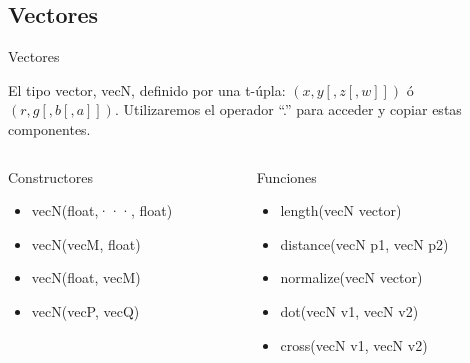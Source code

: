 \subsection{Vectores}
\begin{frame}{Vectores}

    El  tipo  vector, vecN,  definido  por  una  t-úpla:  \((x,y[,z[,w]])\) ó \((r,g[,b[,a]])\). Utilizaremos el operador \enquote{.} para acceder y copiar estas componentes.
    \vfill
    
    \begin{columns}[onlytextwidth]
        \begin{column}{0.45\textwidth}
            {\Large Constructores}
            \begin{itemize}
                \item vecN(float,···, float)
                \item vecN(vecM, float)
                \item vecN(float, vecM)
                \item vecN(vecP, vecQ)
            \end{itemize}
        \end{column}
        
        \begin{column}{0.45\textwidth}
            {\Large Funciones}
            \begin{itemize}
                \item length(vecN vector)
                \item distance(vecN p1, vecN p2)
                \item normalize(vecN vector)
                \item dot(vecN v1, vecN v2)
                \item cross(vecN v1, vecN v2)
            \end{itemize}
        \end{column}
        
    \end{columns}

\end{frame}

